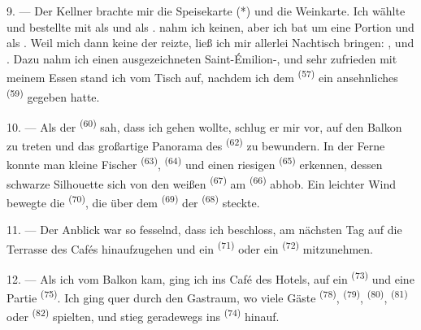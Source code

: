 \VUsaut{4.0mm}
\VUsaut{3.0mm}

9. --- Der Kellner brachte mir die Speisekarte (*) und die Weinkarte. Ich wählte und
bestellte  mit  als  und als
 .  nahm ich
keinen, aber ich bat um eine Portion  und als 
. Weil mich dann keine der  reizte, ließ ich
mir allerlei Nachtisch bringen: ,  und .
Dazu nahm ich einen ausgezeichneten Saint-Émilion-, und sehr zufrieden
mit meinem Essen stand ich vom Tisch auf, nachdem ich dem 
\textsuperscript{(57)} ein ansehnliches  \textsuperscript{(59)}
gegeben hatte.

10. --- Als der  \textsuperscript{(60)} sah, dass ich gehen
wollte, schlug er mir vor, auf den Balkon zu treten und das großartige Panorama des
 \textsuperscript{(62)} zu bewundern. In der Ferne konnte man kleine
Fischer \textsuperscript{(63)}, 
\textsuperscript{(64)} und einen riesigen 
\textsuperscript{(65)} erkennen, dessen schwarze Silhouette sich von den weißen
 \textsuperscript{(67)} am  \textsuperscript{(66)}
abhob. Ein leichter Wind bewegte die  \textsuperscript{(70)}, die über
dem  \textsuperscript{(69)} der 
\textsuperscript{(68)} steckte.

\VUsaut{3.0mm}
\VUsaut{3.0mm}

11. --- Der Anblick war so fesselnd, dass ich beschloss, am nächsten Tag auf die
Terrasse des Cafés hinaufzugehen und ein  \textsuperscript{(71)}
oder ein  \textsuperscript{(72)} mitzunehmen.

12. --- Als ich vom Balkon kam, ging ich ins Café des Hotels, auf ein
 \textsuperscript{(73)} und eine Partie 
\textsuperscript{(75)}. Ich ging quer durch den Gastraum, wo viele Gäste
 \textsuperscript{(78)},  \textsuperscript{(79)},
 \textsuperscript{(80)},  \textsuperscript{(81)} oder
 \textsuperscript{(82)} spielten, und stieg geradewegs ins
 \textsuperscript{(74)} hinauf.

